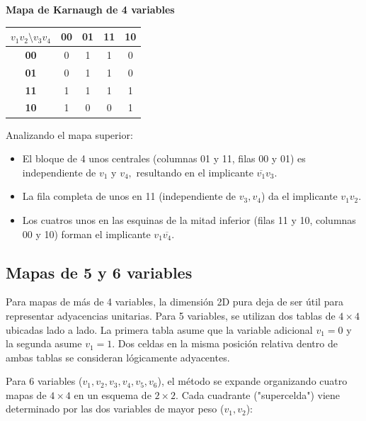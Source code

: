 \begin{center}
\textbf{Mapa de Karnaugh de 4 variables} \\
\begin{tabular}{|c|c|c|c|c|}
\hline
 $v_1v_2 \setminus v_3v_4$ & \textbf{00} & \textbf{01} & \textbf{11} & \textbf{10} \\ \hline
 \textbf{00} & 0 & 1 & 1 & 0 \\ \hline
 \textbf{01} & 0 & 1 & 1 & 0 \\ \hline
 \textbf{11} & 1 & 1 & 1 & 1 \\ \hline
 \textbf{10} & 1 & 0 & 0 & 1 \\ \hline
\end{tabular}
\end{center}

Analizando el mapa superior:
\begin{itemize}
    \item El bloque de 4 unos centrales (columnas 01 y 11, filas 00 y 01) es independiente de $v_1$ y $v_4,$ resultando en el implicante $\overline{v_1}v_3.$
    \item La fila completa de unos en 11 (independiente de $v_3, v_4$) da el implicante $v_1v_2.$
    \item Los cuatros unos en las esquinas de la mitad inferior (filas 11 y 10, columnas 00 y 10) forman el implicante $v_1\overline{v_4}.$
\end{itemize}

\subsection{Mapas de 5 y 6 variables}
Para mapas de más de 4 variables, la dimensión 2D pura deja de ser útil para representar adyacencias unitarias.
Para 5 variables, se utilizan dos tablas de $4 \times 4$ ubicadas lado a lado. La primera tabla asume que la variable adicional $v_1 = 0$ y la segunda asume $v_1 = 1.$ Dos celdas en la misma posición relativa dentro de ambas tablas se consideran lógicamente adyacentes.

Para 6 variables ($v_1, v_2, v_3, v_4, v_5, v_6$), el método se expande organizando cuatro mapas de $4 \times 4$ en un esquema de $2 \times 2.$ Cada cuadrante ("supercelda") viene determinado por las dos variables de mayor peso ($v_1, v_2$):

